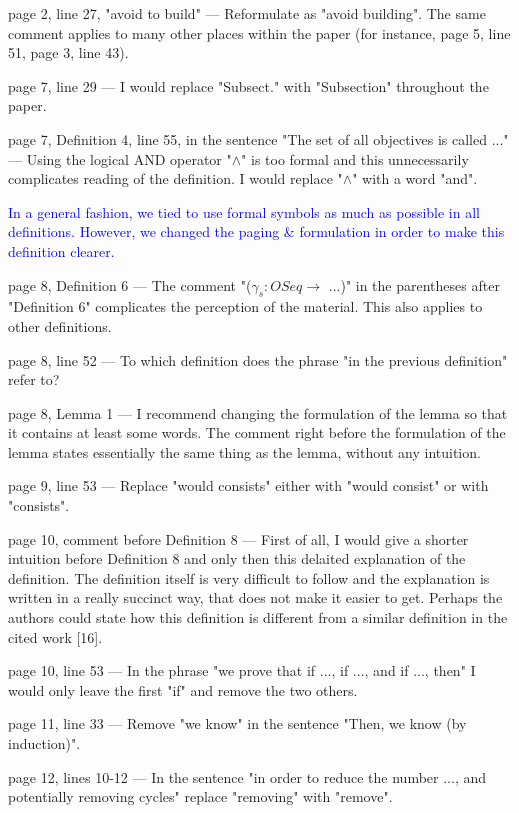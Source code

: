\documentclass[11pt]{article}
\newcommand{\ilanswer}[1]{\textcolor{blue}{#1}}
\newcommand{\answer}[1]{\ilanswer{#1}\vspace*{1em}}
\begin{document}
page 2, line 27, "avoid to build" ---
Reformulate as "avoid building".
The same comment applies to many other places within the paper (for instance, page 5, line 51, page 3, line 43).

page 7, line 29 ---
I would replace "Subsect." with "Subsection" throughout the paper.

page 7, Definition 4, line 55, in the sentence "The set of all objectives is called ..." ---
Using the logical AND operator "$\land$" is too formal and this unnecessarily complicates reading of the definition.
I would replace "$\land$" with a word "and".

\answer{In a general fashion, we tied to use formal symbols as much as possible in all definitions.
However, we changed the paging \& formulation in order to make this definition clearer.}

page 8, Definition 6 ---
The comment "($\gamma_s: OSeq \to$ ...)" in the parentheses after "Definition 6" complicates the perception of the material. This also applies to other definitions.

page 8, line 52 ---
To which definition does the phrase "in the previous definition" refer to?

page 8, Lemma 1 ---
I recommend changing the formulation of the lemma so that it contains at least some words.
The comment right before the formulation of the lemma states essentially the same thing as the lemma, without any intuition.

page 9, line 53 ---
Replace "would consists" either with "would consist" or with "consists".

page 10, comment before Definition 8 ---
First of all, I would give a shorter intuition before Definition 8 and only then this delaited explanation of the definition. The definition itself is very difficult to follow and the explanation is written in a really succinct way, that does not make it easier to get. Perhaps the authors could state how this definition is different from a similar definition in the cited work [16].

page 10, line 53 ---
In the phrase "we prove that if ..., if ..., and if ..., then" I would only leave the first "if" and remove the two others.

page 11, line 33 ---
Remove "we know" in the sentence "Then, we know (by induction)".

page 12, lines 10-12 ---
In the sentence "in order to reduce the number ..., and potentially removing cycles" replace "removing" with "remove".
\end{document}
